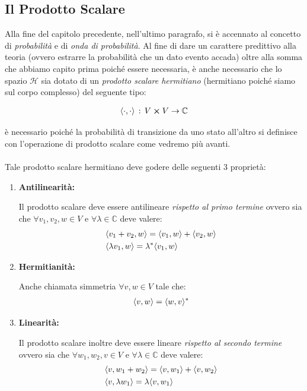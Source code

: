 \subsection{Il Prodotto Scalare}
	
	Alla fine del capitolo precedente, nell'ultimo paragrafo, si è accennato al concetto di \textit{probabilità} e di \textit{onda di probabilità}. Al fine di dare un carattere predittivo alla teoria (ovvero estrarre la probabilità che un dato evento accada) oltre alla somma che abbiamo capito prima poiché essere necessaria, è anche necessario che lo spazio $\mathcal{H}$ sia dotato di un \textit{prodotto scalare hermitiano} (hermitiano poiché siamo sul corpo complesso) del seguente tipo:
	
\begin{align*}
	\mean{\cdot, \cdot} \,  :  \,  V \cp V  \to \mathbb{C}
\end{align*}

	è necessario poiché la probabilità di transizione da uno stato all'altro si definisce con l'operazione di prodotto scalare come vedremo più avanti.
	\\
	\\
	Tale prodotto scalare hermitiano deve godere delle seguenti $3$ proprietà:
	
\begin{enumerate}[label=\arabic*)]
	\item \textbf{Antilinearità:}
	
		Il prodotto scalare deve essere antilineare \textit{rispetto al primo termine} ovvero sia che $\forall v_1, v_2, w \in V$ e $\forall \lambda \in \mathbb{C}$ deve valere:
	\begin{align*}
		&\langle v_1+v_2, w \rangle = \langle v_1, w \rangle  + \langle v_2, w \rangle \\
		&\langle \lambda v_1, w \rangle = \lambda^*\langle v_1, w \rangle
	\end{align*}
	
	\item \textbf{Hermitianità:}
		
		Anche chiamata simmetria $\forall v, w \in V$ tale che:
	\begin{align*}
		\langle v, w \rangle = \langle w, v \rangle^*
	\end{align*} 
	
	\item \textbf{Linearità:}
	
		Il prodotto scalare inoltre deve essere lineare \textit{rispetto al secondo termine} ovvero sia che $\forall w_1, w_2, v \in V$ e $\forall \lambda \in \mathbb{C}$ deve valere:
	\begin{align*}
		&\langle v, w_1 + w_2 \rangle = \langle v, w_1 \rangle  + \langle v, w_2 \rangle \\
		&\langle v, \lambda w_1 \rangle = \lambda\langle v, w_1 \rangle
	\end{align*}
	
\end{enumerate}

